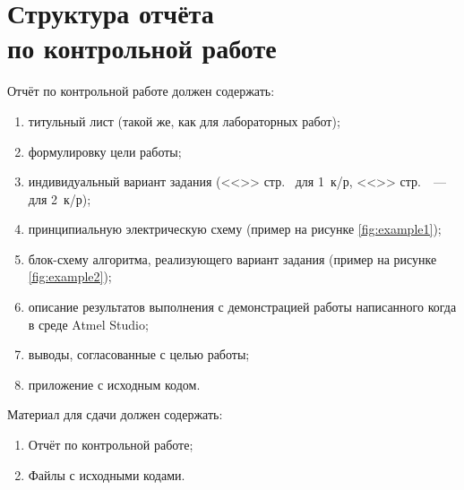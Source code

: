 \documentclass[main.tex]{subfiles}
\begin{document}
\chapter[Структура отчёта по контрольной работе]{Структура отчёта\\ по контрольной работе}\label{ch:str}

Отчёт по контрольной работе должен содержать:

\begin{enumerate}
\item титульный лист (такой же, как для лабораторных работ);
\item формулировку цели работы;
\item индивидуальный вариант задания (<<>> стр.~\pageref{ch:var1} для 1~к/р, <<>> стр.~\pageref{ch:var2}~--- для 2~к/р);
\item принципиальную электрическую схему (пример на рисунке \ref{fig:example1});
\item блок-схему алгоритма, реализующего вариант задания (пример на рисунке \ref{fig:example2});
\item описание результатов выполнения с демонстрацией работы написанного когда в среде Atmel Studio;
\item выводы, согласованные с целью работы;
\item приложение с исходным кодом.
\end{enumerate}

Материал для сдачи должен содержать:

\begin{enumerate}
\item Отчёт по контрольной работе;
\item Файлы с исходными кодами.
\end{enumerate}
\end{document}
